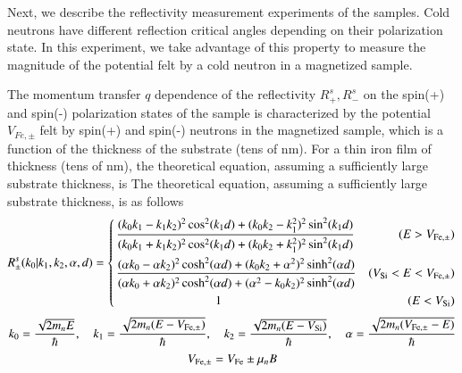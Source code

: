 \documentclass{jps-cp}
\begin{document}
Next, we describe the reflectivity measurement experiments of the samples. Cold neutrons have different reflection critical angles depending on their polarization state. In this experiment, we take advantage of this property to measure the magnitude of the potential felt by a cold neutron in a magnetized sample.

The momentum transfer $q$ dependence of the reflectivity $R^s_+,R^s_-$ on the spin(+) and spin(-) polarization states of the sample is characterized by the potential $V_{Fe,\pm}$ felt by spin(+) and spin(-) neutrons in the magnetized sample, which is a function of the thickness of the substrate (tens of nm). For a thin iron film of thickness (tens of nm), the theoretical equation, assuming a sufficiently large substrate thickness, is
The theoretical equation, assuming a sufficiently large substrate thickness, is as follows
\begin{equation}
R^s_\pm (k_0 | k_1, k_2, \alpha, d)  = \left\{ \,
 \begin{aligned}
& \frac{(k_0k_1-k_1k_2)^2\cos^2(k_1d)+(k_0k_2-k_1^2)^2\sin^2 (k_1d)}{(k_0k_1+k_1k_2)^2\cos^2(k_1d)+(k_0k_2+k_1^2)^2\sin^2 (k_1d)}  &  (E>V_{\rm Fe,\pm}) \\
& \frac{(\alpha k_0-\alpha k_2)^2\cosh^2(\alpha d  )+(k_0k_2+\alpha^2)^2\sinh^2 (\alpha d)}{(\alpha k_0+\alpha k_2)^2\cosh^2(\alpha d)+(\alpha^2-k_0k_2)^2\sinh^2 (\alpha d)} &  (V_{\rm Si} < E< V_{\rm Fe,\pm}) \\
& \qquad \qquad \qquad\qquad  1   & (E<V_{\rm Si})
    \end{aligned}
\right.
\end{equation}
\begin{equation}
    k_0=\frac {\sqrt{2m_nE} }{\hbar},\quad k_1=\frac {\sqrt{2m_n (E-V_{\rm Fe,\pm})} }{\hbar},\quad k_2=\frac {\sqrt{2m_n (E-V_{\rm Si})} }{\hbar},\quad \alpha=\frac {\sqrt{2m_n (V_{\rm Fe,\pm}-E)} }{\hbar}
\end{equation}
\begin{equation}
    V_{\rm Fe,\pm}=V_{\rm Fe}\pm \mu_n B
\end{equation}


\end{document}
